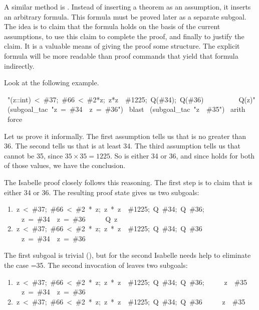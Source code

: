 \medskip
A similar method is .
Instead
of inserting  a theorem as an assumption, it inserts an arbitrary formula. 
This formula must be proved later as a separate subgoal. The 
idea is to claim that the formula holds on the basis of the current 
assumptions, to use this claim to complete the proof, and finally 
to justify the claim. It is a valuable means of giving the proof 
some structure. The explicit formula will be more readable than 
proof commands that yield that formula indirectly.

Look at the following example. 
\begin{isabelle}
\ "\isasymlbrakk(z::int)\ <\ \#37;\ \#66\ <\ \#2*z;\ z*z\
\isasymnoteq\ \#1225;\ Q(\#34);\ Q(\#36)\isasymrbrakk\isanewline
\ \ \ \ \ \ \ \ \,\isasymLongrightarrow\ Q(z)"\isanewline
{}\ (subgoal_tac\ "z\ =\ \#34\ \isasymor\ z\ =\
\#36")\isanewline
{}\ blast\isanewline
{}\ (subgoal_tac\ "z\ \isasymnoteq\ \#35")\isanewline
\isacommand{apply}\ arith\isanewline
\isacommand{apply}\ force\isanewline
\isacommand{done}
\end{isabelle}
Let us prove it informally.  The first assumption tells us 
that  is no greater than 36. The second tells us that \isa{z} 
is at least 34. The third assumption tells us that \isa{z} cannot be 35, since
$35\times35=1225$.  So \isa{z} is either 34 or 36, and since \isa{Q} holds for
both of those  values, we have the conclusion. 

The Isabelle proof closely follows this reasoning. The first 
step is to claim that  is either 34 or 36. The resulting proof 
state gives us two subgoals: 
\begin{isabelle}
\ 1.\ \isasymlbrakk z\ <\ \#37;\ \#66\ <\ \#2\ *\ z;\ z\ *\ z\ \isasymnoteq\ \#1225;\ Q\ \#34;\ Q\ \#36;\isanewline
\ \ \ \ \ z\ =\ \#34\ \isasymor\ z\ =\ \#36\isasymrbrakk\isanewline
\ \ \ \ \isasymLongrightarrow\ Q\ z\isanewline
\ 2.\ \isasymlbrakk z\ <\ \#37;\ \#66\ <\ \#2\ *\ z;\ z\ *\ z\ \isasymnoteq\ \#1225;\ Q\ \#34;\ Q\ \#36\isasymrbrakk\isanewline
\ \ \ \ \isasymLongrightarrow\ z\ =\ \#34\ \isasymor\ z\ =\ \#36
\end{isabelle}
The first subgoal is trivial (\isa{blast}), but for the second Isabelle needs help to eliminate
the case
\isa{z}=35.  The second invocation  of {\isa{subgoal_tac}} leaves two
subgoals: 
\begin{isabelle}
\ 1.\ \isasymlbrakk z\ <\ \#37;\ \#66\ <\ \#2\ *\ z;\ z\ *\ z\ \isasymnoteq\
\#1225;\ Q\ \#34;\ Q\ \#36;\isanewline
\ \ \ \ \ z\ \isasymnoteq\ \#35\isasymrbrakk\isanewline
\ \ \ \ \isasymLongrightarrow\ z\ =\ \#34\ \isasymor\ z\ =\ \#36\isanewline
\ 2.\ \isasymlbrakk z\ <\ \#37;\ \#66\ <\ \#2\ *\ z;\ z\ *\ z\ \isasymnoteq\ \#1225;\ Q\ \#34;\ Q\ \#36\isasymrbrakk\isanewline
\ \ \ \ \isasymLongrightarrow\ z\ \isasymnoteq\ \#35
\end{isabelle}

